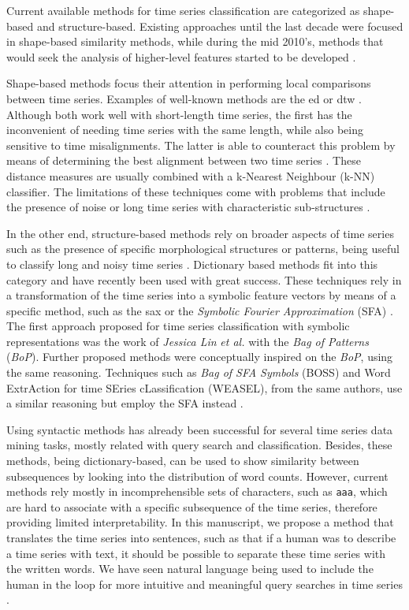 Current available methods for time series classification are categorized as shape-based and structure-based. Existing approaches until the last decade were focused in shape-based similarity methods, while during the mid 2010's, methods that would seek the analysis of higher-level features started to be developed \cite{Keogh2004}.
\par
Shape-based methods focus their attention in performing local comparisons between time series. Examples of well-known methods are the \gls{ed} or \gls{dtw} \cite{jlin2013}. Although both work well with short-length time series, the first has the inconvenient of needing time series with the same length, while also being sensitive to time misalignments. The latter is able to counteract this problem by means of determining the best alignment between two time series \cite{Keogh2004, jlin2013}. These distance measures are usually combined with a k-Nearest Neighbour (k-NN) classifier. The limitations of these techniques come with problems that include the presence of noise or long time series with characteristic sub-structures \cite{BOSS}.
\par
In the other end, structure-based methods rely on broader aspects of time series such as the presence of specific morphological structures or patterns, being useful to classify long and noisy time series \cite{BOSS}. Dictionary based methods fit into this category and have recently been used with great success. These techniques rely in a transformation of the time series into a symbolic feature vectors by means of a specific method, such as the \gls{sax} \cite{sax} or the \textit{Symbolic Fourier Approximation} (SFA) \cite{SFA}. The first approach proposed for time series classification with symbolic representations was the work of \textit{Jessica Lin} \textit{et al.} with the \textit{Bag of Patterns} (\textit{BoP})\cite{jlin2013}. Further proposed methods were conceptually inspired on the \textit{BoP}, using the same reasoning. Techniques such as \textit{Bag of SFA Symbols} (BOSS) and Word ExtrAction for time SEries cLassification (WEASEL), from the same authors, use a similar reasoning but employ the SFA instead \cite{BOSS, weasle}.
\par
Using syntactic methods has already been successful for several time series data mining tasks, mostly related with query search and classification. Besides, these methods, being dictionary-based, can be used to show similarity between subsequences by looking into the distribution of word counts. However, current methods rely mostly in incomprehensible sets of characters, such as \texttt{aaa}, which are hard to associate with a specific subsequence of the time series, therefore providing limited interpretability. In this manuscript, we propose a method that translates the time series into sentences, such as that if a human was to describe a time series with text, it should be possible to separate these time series with the written words. We have seen natural language being used to include the human in the loop for more intuitive and meaningful query searches in time series \cite{puttinghuman, qute}.
